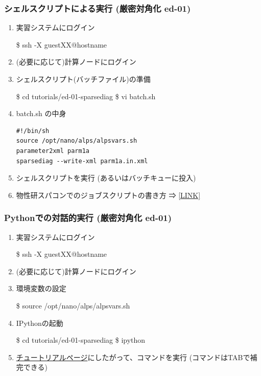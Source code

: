 \begin{frame}[fragile]
  \frametitle{シェルスクリプトによる実行 (厳密対角化 ed-01)}
  \begin{enumerate}
  \item 実習システムにログイン
\begin{semiverbatim}
\$ ssh -X guest{\color{red}XX}@{\color{red}hostname}
\end{semiverbatim}
  \item (必要に応じて)計算ノードにログイン
  \item シェルスクリプト(バッチファイル)の準備
\begin{semiverbatim}
\$ cd tutorials/ed-01-sparsediag
\$ vi batch.sh
\end{semiverbatim}
  \item batch.sh の中身
\begin{lstlisting}
#!/bin/sh
source /opt/nano/alps/alpsvars.sh
parameter2xml parm1a
sparsediag --write-xml parm1a.in.xml
\end{lstlisting}
  \item シェルスクリプトを実行 (あるいはバッチキューに投入)
  \item 物性研スパコンでのジョブスクリプトの書き方 ⇒ \href{http://www.issp.u-tokyo.ac.jp/supercom/for-users/x92nxz/alps}{[LINK]}
  \end{enumerate}
\end{frame}

\begin{frame}[fragile]
  \frametitle{Pythonでの対話的実行 (厳密対角化 ed-01)}
  \begin{enumerate}
  \item 実習システムにログイン
\begin{semiverbatim}
\$ ssh -X guest{\color{red}XX}@{\color{red}hostname}
\end{semiverbatim}
  \item (必要に応じて)計算ノードにログイン
  \item 環境変数の設定
\begin{semiverbatim}
\$ source /opt/nano/alps/alpsvars.sh
\end{semiverbatim}
  \item IPythonの起動
\begin{semiverbatim}
\$ cd tutorials/ed-01-sparsediag
\$ ipython
\end{semiverbatim}
  \item \href{http://alps.comp-phys.org/mediawiki/index.php/ALPS_2_Tutorials:ED-01_SparseDiagonalization/ja#Python.E3.81.A7.E3.81.AE.E5.AE.9F.E8.A1.8C}{チュートリアルページ}にしたがって、コマンドを実行 (コマンドはTABで補完できる)
  \end{enumerate}
\end{frame}


